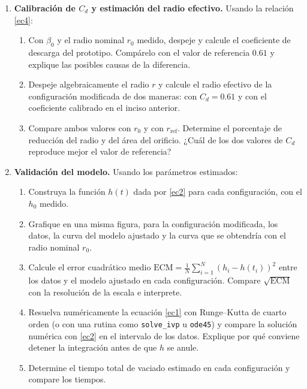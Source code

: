 \documentclass[oneside,letter,spanish,activeacute,english,links,10pt]{amcaGCS_EDO}
\begin{document}
\begin{enumerate}
		\item {\bf Calibración de $C_d$ y estimación del radio efectivo.}
		Usando la relación \eqref{ec4}:
		\begin{enumerate}
			\item Con $\beta_0$ y el radio nominal $r_0$ medido, despeje y calcule el coeficiente de descarga del prototipo. Compárelo con el valor de referencia $0.61$ y explique las posibles causas de la diferencia.
			\item Despeje algebraicamente el radio $r$ y calcule el radio efectivo de la configuración modificada de dos maneras: con $C_d=0.61$ y con el coeficiente calibrado en el inciso anterior.
			\item Compare ambos valores con $r_0$ y con $r_{\mathrm{ref}}$. Determine el porcentaje de reducción del radio y del área del orificio. ¿Cuál de los dos valores de $C_d$ reproduce mejor el valor de referencia? %
		\end{enumerate}
		
		\item {\bf Validación del modelo.}
		Usando los parámetros estimados:
		\begin{enumerate}
			\item Construya la función $h(t)$ dada por \eqref{ec2} para cada configuración, con el $h_0$ medido.
			\item Grafique en una misma figura, para la configuración modificada, los datos, la curva del modelo ajustado y la curva que se obtendría con el radio nominal $r_0$.
			\item Calcule el error cuadrático medio $\mathrm{ECM}=\frac{1}{N}\sum_{i=1}^{N}\left(h_i-h(t_i)\right)^2$ entre los datos y el modelo ajustado en cada configuración. Compare $\sqrt{\mathrm{ECM}}$ con la resolución de la escala e interprete.
			\item Resuelva numéricamente la ecuación \eqref{ec1} con Runge--Kutta de cuarto orden (o con una rutina como \texttt{solve\_ivp} u \texttt{ode45}) y compare la solución numérica con \eqref{ec2} en el intervalo de los datos. Explique por qué conviene detener la integración antes de que $h$ se anule.
			\item Determine el tiempo total de vaciado estimado en cada configuración y compare los tiempos.
		\end{enumerate}
		

\end{enumerate}
\end{document}

